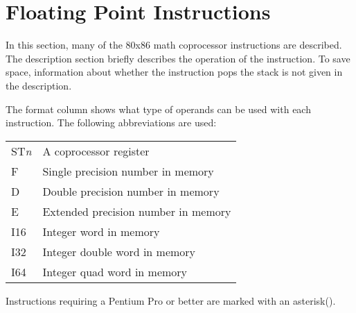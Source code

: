 \newpage
\section{Floating Point Instructions}

\renewcommand{\thefootnote}{\fnsymbol{footnote}} In this section, many
of the 80x86 math coprocessor instructions are described. The
description section briefly describes the operation of the
instruction. To save space, information about whether the instruction
pops the stack is not given in the description. 

The format column shows what type of operands can be used with each
instruction. The following abbreviations are used:
\begin{center}
\begin{tabular}{|l|l|}
\hline
ST\emph{n} & A coprocessor register \\
F          & Single precision number in memory \\
D          & Double precision number in memory \\
E          & Extended precision number in memory \\
I16        & Integer word in memory \\
I32        & Integer double word in memory \\
I64        & Integer quad word in memory \\
\hline
\end{tabular}
\end{center}

Instructions requiring a Pentium Pro or better are marked with an 
asterisk(\footnotemark[1]).

